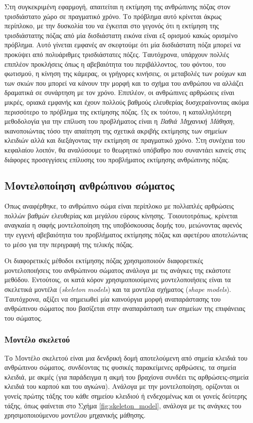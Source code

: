Στη συγκεκριμένη εφαρμογή, απαιτείται η εκτίμηση της ανθρώπινης πόζας στον τρισδιάστατο χώρο σε πραγματικό χρόνο. Το πρόβλημα αυτό κρίνεται άκρως περίπλοκο, με την δυσκολία του να έγκειται στο γεγονός ότι η εκτίμηση της τρισδιάστατης πόζας από μία δισδιάστατη εικόνα είναι εξ ορισμού κακώς ορισμένο πρόβλημα. Αυτό γίνεται εμφανές αν σκεφτούμε ότι μία δισδιάστατη πόζα μπορεί να προκύψει από πολυάριθμες τρισδιάστατες πόζες. Ταυτόχρονα, υπάρχουν πολλές επιπλέον προκλήσεις όπως η αβεβαιότητα του περιβάλλοντος, του φόντου, του φωτισμού, η κίνηση της κάμερας, οι γρήγορες κινήσεις, οι μεταβολές των ρούχων και των σκιών που μπορεί να κάνουν την μορφή και το σχήμα του ανθρώπου να αλλάζει δραματικά σε συνάρτηση με τον χρόνο. Επιπλέον, οι ανθρώπινες αρθρώσεις είναι μικρές, οριακά εμφανής και έχουν πολλούς βαθμούς ελευθερίας δυσχεραίνοντας ακόμα περισσότερο το πρόβλημα της εκτίμησης πόζας. Ως εκ τούτου, η καταλληλότερη μεθοδολογία για την επίλυση του προβλήματος είναι η \textsl{Βαθιά Μηχανική Μάθηση}, ικανοποιώντας τόσο την απαίτηση της σχετικά ακριβής εκτίμησης των σημείων κλειδιών αλλά και διεξάγοντας την εκτίμηση σε πραγματικό χρόνο. Στη συνέχεια του κεφαλαίου λοιπόν, θα αναλύσουμε το θεωρητικό υπόβαθρο που συναντάει κανείς στις διάφορες προσεγγίσεις επίλυσης του προβλήματος εκτίμησης ανθρώπινης πόζας.

\subsection{Μοντελοποίηση ανθρώπινου σώματος}

Όπως αναφέρθηκε, το ανθρώπινο σώμα είναι περίπλοκο με πολλαπλές αρθρώσεις πολλών βαθμών ελευθερίας και μεγάλου εύρους κίνησης. Τοιουτοτρόπως, κρίνεται αναγκαία η σαφής μοντελοποίηση της υποβόσκουσας δομής του, μειώνοντας αφενός την εγγενή αβεβαιότητα του προβλήματος εκτίμησης πόζας και αφετέρου αποτελώντας το μέσο για την περιγραφή της τελικής πόζας.

Οι διαφορετικές μέθοδοι εκτίμησης πόζας χρησιμοποιούν διαφορετικές μοντελοποιήσεις του ανθρώπινου σώματος ανάλογα με τις ανάγκες της εκάστοτε μεθόδου. Εντούτοις, οι κατά κόρον χρησιμοποιούμενες μοντελοποιήσεις είναι τα σκελετικά μοντέλα (\textsl{skeleton models}) και τα μοντέλα σχήματος (\textsl{shape models}). Ταυτόχρονα, αξίζει να σημειωθεί μία καινούργια μορφή αναπαράστασης του ανθρώπινου σώματος που βασίζεται στην αναπαράσταση των σημείων της επιφάνειας του σώματος. \cite{densepose_paper}

\subsubsection{Μοντέλο σκελετού}
\label{section:skeleton_model}
Το Μοντέλο σκελετού είναι μια δενδρική δομή αποτελούμενη από σημεία κλειδιά του ανθρώπινου σώματος, συνδέοντας τις φυσικές παρακείμενες αρθρώσεις, τα σημεία κλειδιά, με ακμές (για παράδειγμα η ακμή του βραχίονα συνδέει τις αρθρώσεις-σημεία κλειδιά του καρπού και του αγκώνα). Ανάλογα με την μοντελοποίηση, ορίζονται οι γονείς πρώτης τάξης του κάθε σημείου κλειδιού ή ενδεχομένως και οι γονείς δεύτερης τάξης, όπως φαίνεται στο Σχήμα \ref{fig:skeleton_model}, ανάλογα με τις ανάγκες του χρησιμοποιούμενου μοντέλου μηχανικής μάθησης.
    
